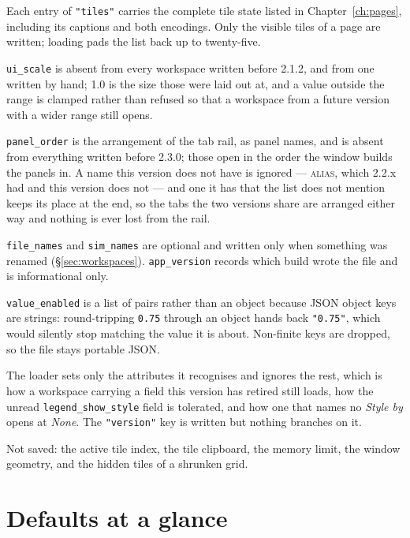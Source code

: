 \documentclass[11pt,a4paper,oneside]{report}
\newcommand{\appver}{2.3.0}
\newcommand{\code}[1]{\texttt{#1}}
\newcommand{\tab}[1]{\textsc{#1}}
\begin{document}
Each entry of \code{"tiles"} carries the complete tile state listed in
Chapter~\ref{ch:pages}, including its captions and both encodings. Only the
visible tiles of a page are written; loading pads the list back up to
twenty-five.

\code{ui\_scale} is absent from every workspace written before 2.1.2, and from
one written by hand; 1.0 is the size those were laid out at, and a value
outside the range is clamped rather than refused so that a workspace from a
future version with a wider range still opens.

\code{panel\_order} is the arrangement of the tab rail, as panel names, and is
absent from everything written before \appver{}; those open in the order the
window builds the panels in. A name this version does not have is ignored ---
\tab{alias}, which 2.2.x had and this version does not --- and one it has that
the list does not mention keeps its place at the end, so the tabs the two
versions share are arranged either way and nothing is ever lost from the rail.

\code{file\_names} and \code{sim\_names} are optional and written only when
something was renamed (\S\ref{sec:workspaces}). \code{app\_version} records
which build wrote the file and is informational only.

\code{value\_enabled} is a list of pairs rather than an object because JSON
object keys are strings: round-tripping \code{0.75} through an object hands back
\code{"0.75"}, which would silently stop matching the value it is about.
Non-finite keys are dropped, so the file stays portable JSON.

The loader sets only the attributes it recognises and ignores the rest, which is
how a workspace carrying a field this version has retired still loads, how the
unread \code{legend\_show\_style} field is tolerated, and how one that names no
\emph{Style by} opens at \emph{None}. The \code{"version"} key is written but nothing
branches on it.

Not saved: the active tile index, the tile clipboard, the memory limit, the
window geometry, and the hidden tiles of a shrunken grid.

\chapter{Defaults at a glance}
\end{document}
